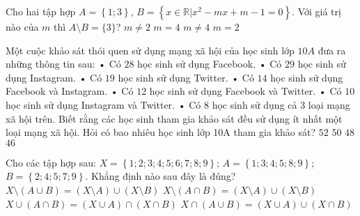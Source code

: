 \begin{ex}
	Cho hai tập hợp $A=\left\{ 1;3 \right\}$, $B=\left\{ x\in \mathbb{R}|x^2-mx+m-1=0 \right\}$. Với giá trị nào của $m$ thì $A\setminus B=\{3\}$?
	\choice
	{$m\ne 2$}
	{$m=4$}
	{\True $m\ne 4$}
	{$m=2$}
\end{ex}
\begin{ex}
	Một cuộc khảo sát thói quen sử dụng mạng xã hội của học sinh lớp $10A$ đưa ra những thông tin sau:
	• Có $28$ học sinh sử dụng Facebook.
	• Có $29$ học sinh sử dụng Instagram.
	• Có $19$ học sinh sử dụng Twitter.
	• Có $14$ học sinh sử dụng Facebook và Instagram.
	• Có $12$ học sinh sử dụng Facebook và Twitter.
	• Có $10$ học sinh sử dụng Instagram và Twitter.
	• Có $8$ học sinh sử dụng cả $3$ loại mạng xã hội trên.
	Biết rằng các học sinh tham gia khảo sát đều sử dụng ít nhất một loại mạng xã hội. Hỏi có bao nhiêu học sinh lớp 10A tham gia khảo sát?
	\choice
	{$52$}
	{$50$}
	{\True $48$}
	{$46$}
\end{ex}
\begin{ex}
	Cho các tập hợp sau: $X=\left\{ 1;2;3;4;5;6;7;8;9 \right\}$; $A=\left\{ 1;3;4;5;8;9 \right\}$; $B=\left\{ 2;4;5;7;9 \right\}$. Khẳng định nào sau đây là đúng?
	\choice
	{$X\setminus \left(A\cup B\right)=\left(X\setminus A\right)\cup \left(X\setminus B\right)$}
	{\True $X\setminus \left(A\cap B\right)=\left(X\setminus A\right)\cup \left(X\setminus B\right)$}
	{$X\cup \left(A\cap B\right)=\left(X\cup A\right)\cap \left(X\cap B\right)$}
	{$X\cap \left(A\cup B\right)=\left(X\cup A\right)\cup \left(X\cap B\right)$}
	\\
	{
	}
\end{ex}

